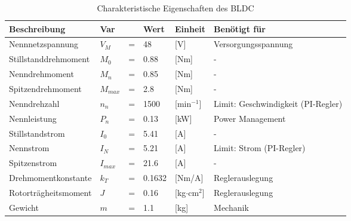 \begin{table}
\begin{tabularx}{\textwidth}{|lllllX|}
\hline
\textbf{Beschreibung} & \textbf{Var} & & \textbf{Wert} & \textbf{Einheit} & \textbf{Benötigt für} \\
\hline
Nennnetzspannung & $V_M$ & = & 48 & [V] & Versorgungsspannung\\
Stillstanddrehmoment & $M_0$ & = & 0.88 & [Nm] & -\\
Nenndrehmoment & $M_n$ & = & 0.85 & [Nm] & -\\
Spitzendrehmoment & $M_{max}$ & = & 2.8 & [Nm] & -\\
Nenndrehzahl & $n_n$ & = & 1500 & [min$^{-1}$] & Limit: Geschwindigkeit (PI-Regler)\\
Nennleistung & $P_n$ & = & 0.13 & [kW] & Power Management\\
Stillstandstrom & $I_0$ & = & 5.41 & [A] & -\\
Nennstrom & $I_N$ & = & 5.21 & [A] & Limit: Strom (PI-Regler)\\
Spitzenstrom & $I_{max}$ & = & 21.6 & [A] & -\\
Drehmomentkonstante & $k_T$ & = & 0.1632 & [Nm/A] & Reglerauslegung\\
Rotorträgheitsmoment & $J$ & = & 0.16 & [kg$\cdot$cm$^2$] & Reglerauslegung\\
Gewicht & $m$ & = & 1.1 & [kg] & Mechanik\\
\hline
\end{tabularx}
\caption{Charakteristische Eigenschaften des BLDC}
\end{table}
